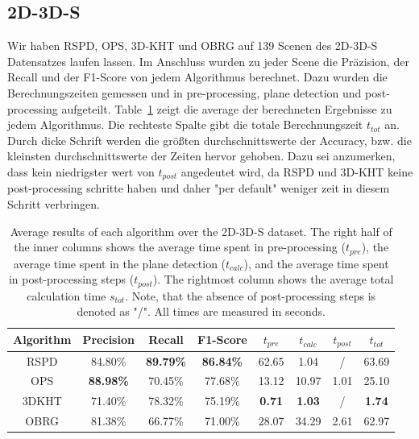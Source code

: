 \documentclass[main.tex]{subfiles}
\begin{document}
\subsection{2D-3D-S}

Wir haben RSPD, OPS, 3D-KHT und OBRG auf 139 Scenen des 2D-3D-S Datensatzes laufen lassen. Im Anschluss wurden zu jeder Scene die Präzision,
der Recall und der F1-Score von jedem Algorithmus berechnet. Dazu wurden die Berechnungszeiten gemessen und in pre-processing, plane detection und
post-processing aufgeteilt. Table~\ref{tab:res-3d2ds-total} zeigt die average der berechneten Ergebnisse zu jedem Algorithmus. 
Die rechteste Spalte gibt die totale Berechnungszeit $t_{tot}$ an. Durch dicke Schrift
werden die größten durchschnittswerte der Accuracy, bzw. die kleinsten durchschnittswerte der Zeiten hervor gehoben. 
Dazu sei anzumerken, dass kein niedrigster wert von $t_{post}$ angedeutet wird, da RSPD und 3D-KHT keine 
post-processing schritte haben und daher "per default" weniger zeit in diesem Schritt verbringen.

\begin{table}[H]
    \centering
    \begin{tabular}{c|cccccc|c}
        Algorithm & Precision        & Recall           & F1-Score         & $t_{pre}$     & $t_{calc}$    & $t_{post}$ & $t_{tot}$     \\ \hline
        RSPD      & 84.80\%          & \textbf{89.79\%} & \textbf{86.84\%} & 62.65         & 1.04          & /          & 63.69         \\
        OPS       & \textbf{88.98\%} & 70.45\%          & 77.68\%          & 13.12         & 10.97         & 1.01       & 25.10         \\
        3DKHT     & 71.40\%          & 78.32\%          & 75.19\%          & \textbf{0.71} & \textbf{1.03} & /          & \textbf{1.74} \\
        OBRG      & 81.38\%          & 66.77\%          & 71.00\%          & 28.07         & 34.29         & 2.61       & 62.97
    \end{tabular}
    \caption[Overall 2D-3D-S Results]{Average results of each algorithm over the 2D-3D-S dataset. The right half of the inner columns shows the average time spent in
        pre-processing ($t_{pre}$), the average time spent in the plane detection ($t_{calc}$), and the average time spent in post-processing steps ($t_{post}$).
        The rightmost column shows the average total calculation time $s_{tot}$.
        Note, that the absence of post-processing steps is denoted as "/". All times are measured in seconds.}
    \label{tab:res-3d2ds-total}
\end{table}
\end{document}
